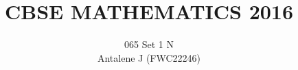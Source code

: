 \documentclass[journal,12pt,twocolumn]{IEEEtran}
\DeclareMathOperator*{\Res}{Res}
\begin{document}
\newtheorem{theorem}{Theorem}[section]
\newtheorem{problem}{Problem}
\newtheorem{proposition}{Proposition}[section]
\newtheorem{lemma}{Lemma}[section]
\newtheorem{corollary}[theorem]{Corollary}
\newtheorem{example}{Example}[section]
\newtheorem{definition}[problem]{Definition}
\newcommand{\BEQA}{\begin{eqnarray}}
\newcommand{\EEQA}{\end{eqnarray}}
\newcommand{\define}{\stackrel{\triangle}{=}}

\providecommand{\mbf}{\mathbf}
\providecommand{\pr}[1]{\ensuremath{\Pr\left(#1\right)}}
\providecommand{\qfunc}[1]{\ensuremath{Q\left(#1\right)}}
\providecommand{\sbrak}[1]{\ensuremath{{}\left[#1\right]}}
\providecommand{\lsbrak}[1]{\ensuremath{{}\left[#1\right.}}
\providecommand{\rsbrak}[1]{\ensuremath{{}\left.#1\right]}}
\providecommand{\brak}[1]{\ensuremath{\left(#1\right)}}
\providecommand{\lbrak}[1]{\ensuremath{\left(#1\right.}}
\providecommand{\rbrak}[1]{\ensuremath{\left.#1\right)}}
\providecommand{\cbrak}[1]{\ensuremath{\left\{#1\right\}}}
\providecommand{\lcbrak}[1]{\ensuremath{\left\{#1\right.}}
\providecommand{\rcbrak}[1]{\ensuremath{\left.#1\right\}}}
\theoremstyle{remark}
\newtheorem{rem}{Remark}
\newcommand{\sgn}{\mathop{\mathrm{sgn}}}
\providecommand{\abs}[1]{\left\vert#1\right\vert}
\providecommand{\res}[1]{\Res\displaylimits_{#1}} 
\providecommand{\norm}[1]{\left\lVert#1\right\rVert}
\providecommand{\mtx}[1]{\mathbf{#1}}
\providecommand{\mean}[1]{E\left[ #1 \right]}
\providecommand{\fourier}{\overset{\mathcal{F}}{ \rightleftharpoons}}
\providecommand{\system}{\overset{\mathcal{H}}{ \longleftrightarrow}}
\newcommand{\solution}{\noindent \textbf{Solution: }}
\newcommand{\cosec}{\,\text{cosec}\,}
\providecommand{\dec}[2]{\ensuremath{\overset{#1}{\underset{#2}{\gtrless}}}}
\newcommand{\myvec}[1]{\ensuremath{\begin{pmatrix}#1\end{pmatrix}}}
\newcommand{\mydet}[1]{\ensuremath{\begin{vmatrix}#1\end{vmatrix}}}
\makeatletter
{}
\makeatother
\let\StandardTheFigure\thefigure
\let\vec\mathbf
\renewcommand{\thefigure}{\theproblem}
\def\putbox#1#2#3{\makebox[0in][l]{\makebox[#1][l]{}\raisebox{\baselineskip}[0in][0in]{\raisebox{#2}[0in][0in]{#3}}}}
     \def\rightbox#1{\makebox[0in][r]{#1}}
     \def\centbox#1{\makebox[0in]{#1}}
     \def\topbox#1{\raisebox{-\baselineskip}[0in][0in]{#1}}
     \def\midbox#1{\raisebox{-0.5\baselineskip}[0in][0in]{#1}}
\vspace{3cm}
\title{CBSE MATHEMATICS 2016}
\author{065 Set 1 N\\
Antalene J (FWC22246)}
\maketitle
\newpage
\bigskip
\renewcommand{\thefigure}{\theenumi}
\renewcommand{\thetable}{\theenumi}
\end{document}
